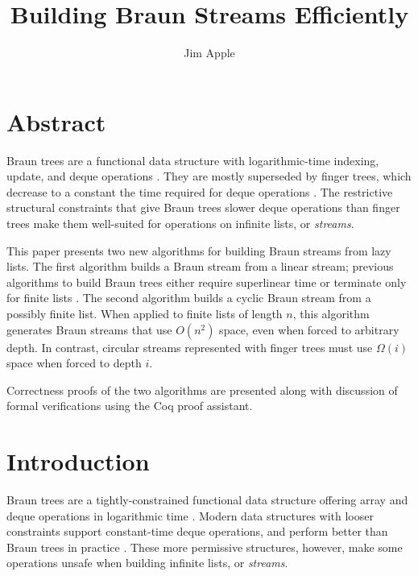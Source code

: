 \documentclass[envcountsect]{llncs}
\begin{document}
\title{Building Braun Streams Efficiently}

\author{Jim Apple}

\institute{}

\maketitle

\section*{Abstract}

Braun trees are a functional data structure with logarithmic-time indexing, update, and deque operations \cite{hoogerwoord}.
They are mostly superseded by finger trees, which decrease to a constant the time required for deque operations \cite{kaplan96purely,HinzePat}.
The restrictive structural constraints that give Braun trees slower deque operations than finger trees make them well-suited for operations on infinite lists, or {\em streams}.

This paper presents two new algorithms for building Braun streams from lazy lists.
The first algorithm builds a Braun stream from a linear stream; previous algorithms to build Braun trees either require superlinear time or terminate only for finite lists \cite{okasakiBraun}.
The second algorithm builds a cyclic Braun stream from a possibly finite list. 
When applied to finite lists of length $n$, this algorithm generates Braun streams that use $O(n^2)$ space, even when forced to arbitrary depth.
In contrast, circular streams represented with finger trees must use $\Omega(i)$ space when forced to depth $i$.

Correctness proofs of the two algorithms are presented along with discussion of formal verifications using the Coq proof assistant.

\section{Introduction}
\label{logspaceCycle}

Braun trees are a tightly-constrained functional data structure offering array and deque operations in logarithmic time \cite{hoogerwoord,okasakiBraun}.
Modern data structures with looser constraints support constant-time deque operations, and perform better than Braun trees in practice \cite{HinzePat,okasakiSkewLists}.
These more permissive structures, however, make some operations unsafe when building infinite lists, or {\em streams}.
\end{document}
